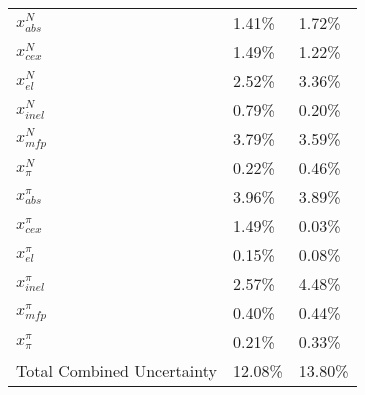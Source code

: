\begin{table*}
\begin{tabular}{| l | l | l |}
$x_{abs}^{N}$ & 1.41\% & 1.72\% \\
$x_{cex}^{N}$ & 1.49\% & 1.22\%\\
$x_{el}^{N}$ & 2.52\% & 3.36\% \\
$x_{inel}^{N}$ & 0.79\% & 0.20\% \\
$x_{mfp}^{N}$ & 3.79\% & 3.59\% \\
$x_{\pi}^{N}$ & 0.22\% & 0.46\% \\
$x_{abs}^{\pi}$ & 3.96\% & 3.89\% \\
$x_{cex}^{\pi}$ & 1.49\% & 0.03\% \\
$x_{el}^{\pi}$ & 0.15\% & 0.08\% \\
$x_{inel}^{\pi}$ & 2.57\% & 4.48\% \\
$x_{mfp}^{\pi}$ & 0.40\% & 0.44\% \\
$x_{\pi}^{\pi}$ & 0.21\% & 0.33\% \\
\hline
Total Combined Uncertainty & 12.08\% & 13.80\% \\ \hline
\end{tabular}
\end{table*}

